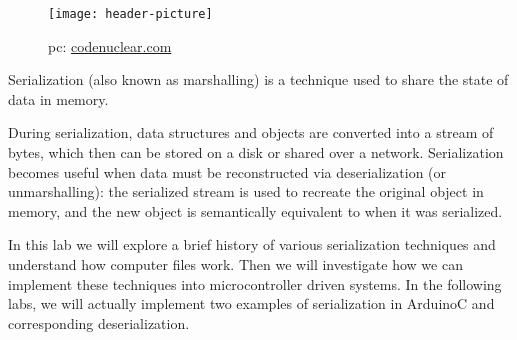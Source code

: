 \begin{wrapfigure}{L}{0.5\textwidth}
    \begin{center}
        \texttt{[image: header-picture]}
    \end{center}
    \caption*{pc: \href{https://www.codenuclear.com/serialization-deserialization-java/}{codenuclear.com}}
\end{wrapfigure}

Serialization (also known as marshalling) is a technique used to share the state of data in memory.  

During serialization, data structures and objects are converted into a stream of bytes, which then can be stored on a disk or shared over a network. Serialization becomes useful when data must be reconstructed via deserialization (or unmarshalling): the serialized stream is used to recreate the original object in memory, and the new object is semantically equivalent to when it was serialized. 

In this lab we will explore a brief history of various serialization techniques and understand how computer files work. Then we will investigate how we can implement these techniques into microcontroller driven systems. In the following labs, we will actually implement two examples of serialization in ArduinoC and corresponding deserialization. 
